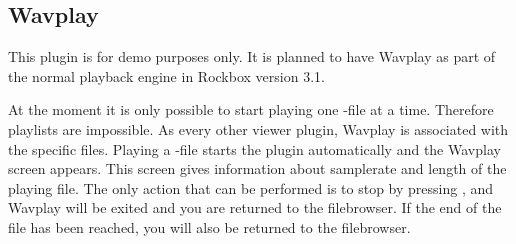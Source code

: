 \subsection{Wavplay}
This plugin is for demo purposes only. It is planned to have 
Wavplay as part of the normal playback engine in Rockbox version 3.1.

At the moment it is only possible to start playing one -file at a 
time. Therefore playlists are impossible. As every other viewer plugin, Wavplay
is associated with the specific files. Playing a -file starts the 
plugin automatically and the Wavplay screen 
appears. This screen gives information about samplerate and length of the 
playing file. 
The only action that can be performed is to stop by pressing \ButtonOff, and 
Wavplay will be exited and you are returned to the  filebrowser. If the end of 
the file has been reached, you will also be returned to the filebrowser.
